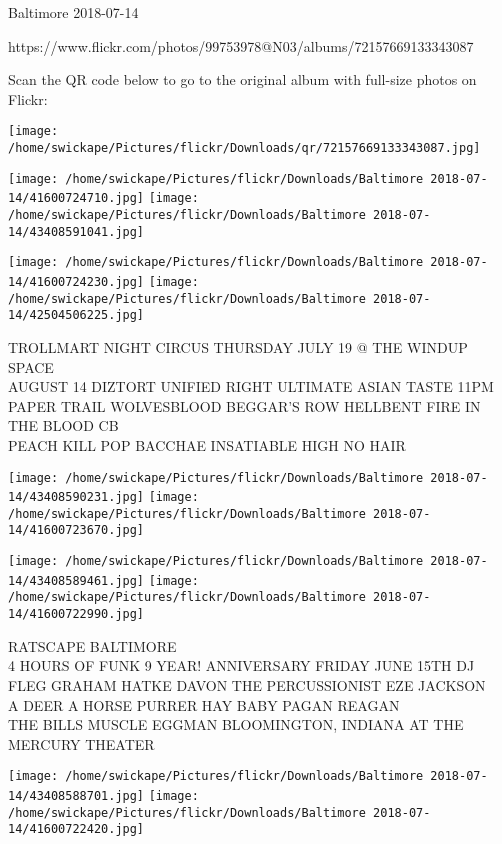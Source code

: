 \documentclass[10pt,letterpaper]{article}
\begin{document}
Baltimore 2018-07-14

https://www.flickr.com/photos/99753978@N03/albums/72157669133343087

Scan the QR code below to go to the original album with full-size photos on Flickr:

\texttt{[image: /home/swickape/Pictures/flickr/Downloads/qr/72157669133343087.jpg]}
\pagebreak

\texttt{[image: /home/swickape/Pictures/flickr/Downloads/Baltimore 2018-07-14/41600724710.jpg]}
\texttt{[image: /home/swickape/Pictures/flickr/Downloads/Baltimore 2018-07-14/43408591041.jpg]}

\texttt{[image: /home/swickape/Pictures/flickr/Downloads/Baltimore 2018-07-14/41600724230.jpg]}
\texttt{[image: /home/swickape/Pictures/flickr/Downloads/Baltimore 2018-07-14/42504506225.jpg]}

TROLLMART NIGHT CIRCUS THURSDAY JULY 19 @ THE WINDUP SPACE\\
AUGUST 14 DIZTORT UNIFIED RIGHT ULTIMATE ASIAN TASTE 11PM\\
PAPER TRAIL WOLVESBLOOD BEGGAR'S ROW HELLBENT FIRE IN THE BLOOD CB\\
PEACH KILL POP BACCHAE INSATIABLE HIGH NO HAIR
\pagebreak

\texttt{[image: /home/swickape/Pictures/flickr/Downloads/Baltimore 2018-07-14/43408590231.jpg]}
\texttt{[image: /home/swickape/Pictures/flickr/Downloads/Baltimore 2018-07-14/41600723670.jpg]}

\texttt{[image: /home/swickape/Pictures/flickr/Downloads/Baltimore 2018-07-14/43408589461.jpg]}
\texttt{[image: /home/swickape/Pictures/flickr/Downloads/Baltimore 2018-07-14/41600722990.jpg]}

RATSCAPE BALTIMORE\\
4 HOURS OF FUNK 9 YEAR! ANNIVERSARY FRIDAY JUNE 15TH DJ FLEG GRAHAM HATKE DAVON THE PERCUSSIONIST EZE JACKSON\\
A DEER A HORSE PURRER HAY BABY PAGAN REAGAN\\
THE BILLS MUSCLE EGGMAN BLOOMINGTON, INDIANA AT THE MERCURY THEATER
\pagebreak

\texttt{[image: /home/swickape/Pictures/flickr/Downloads/Baltimore 2018-07-14/43408588701.jpg]}
\texttt{[image: /home/swickape/Pictures/flickr/Downloads/Baltimore 2018-07-14/41600722420.jpg]}
\end{document}
